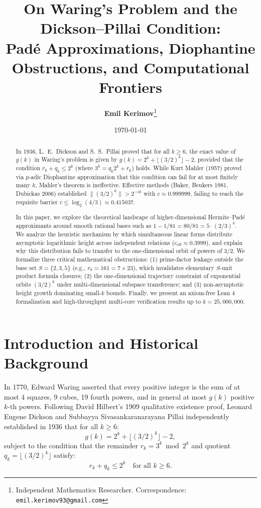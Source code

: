 \documentclass[11pt,reqno]{article}
\title{\textbf{On Waring's Problem and the Dickson--Pillai Condition:\\Pad\'e Approximations, Diophantine Obstructions, and Computational Frontiers}}
\author{
  \textbf{Emil Kerimov}\thanks{Independent Mathematics Researcher. Correspondence: \texttt{emil.kerimov93@gmail.com}}
}
\date{\today}
\theoremstyle{plain}
\theoremstyle{definition}
\numberwithin{equation}{section}
\begin{document}
\maketitle

\begin{abstract}
In 1936, L.~E.~Dickson and S.~S.~Pillai proved that for all $k \ge 6$, the exact value of $g(k)$ in Waring's problem is given by $g(k) = 2^k + \lfloor(3/2)^k\rfloor - 2$, provided that the condition $r_k + q_k \le 2^k$ (where $3^k = q_k 2^k + r_k$) holds. While Kurt Mahler (1957) proved via $p$-adic Diophantine approximation that this condition can fail for at most finitely many $k$, Mahler's theorem is ineffective. Effective methods (Baker, Beukers 1981, Dubickas 2006) established $\|(3/2)^k\| > 2^{-c k}$ with $c \approx 0.999999$, failing to reach the requisite barrier $c \le \log_2(4/3) \approx 0.415037$.

In this paper, we explore the theoretical landscape of higher-dimensional Hermite--Pad\'e approximants around smooth rational bases such as $1 - 1/81 = 80/81 = 5 \cdot (2/3)^4$. We analyze the heuristic mechanism by which simultaneous linear forms distribute asymptotic logarithmic height across independent relations ($c_{\mathrm{eff}} \approx 0.3999$), and explain why this distribution fails to transfer to the one-dimensional orbit of powers of $3/2$. We formalize three critical mathematical obstructions: (1) prime-factor leakage outside the base set $S = \{2, 3, 5\}$ (e.g., $r_8 = 161 = 7 \times 23$), which invalidates elementary $S$-unit product formula closures; (2) the one-dimensional trajectory constraint of exponential orbits $(3/2)^k$ under multi-dimensional subspace transference; and (3) non-asymptotic height growth dominating small-$k$ bounds. Finally, we present an axiom-free Lean 4 formalization and high-throughput multi-core verification results up to $k = 25{,}000{,}000$.
\end{abstract}

\section{Introduction and Historical Background}

In 1770, Edward Waring asserted that every positive integer is the sum of at most 4 squares, 9 cubes, 19 fourth powers, and in general at most $g(k)$ positive $k$-th powers. Following David Hilbert's 1909 qualitative existence proof, Leonard Eugene Dickson \cite{dickson1936} and Subbayya Sivasankaranarayana Pillai \cite{pillai1936} independently established in 1936 that for all $k \ge 6$:
\begin{equation}\label{eq:waring_formula}
g(k) = 2^k + \lfloor(3/2)^k\rfloor - 2,
\end{equation}
subject to the condition that the remainder $r_k = 3^k \bmod 2^k$ and quotient $q_k = \lfloor(3/2)^k\rfloor$ satisfy:
\begin{equation}\label{eq:dickson_pillai}
r_k + q_k \le 2^k \quad \text{for all } k \ge 6.
\end{equation}
\end{document}
